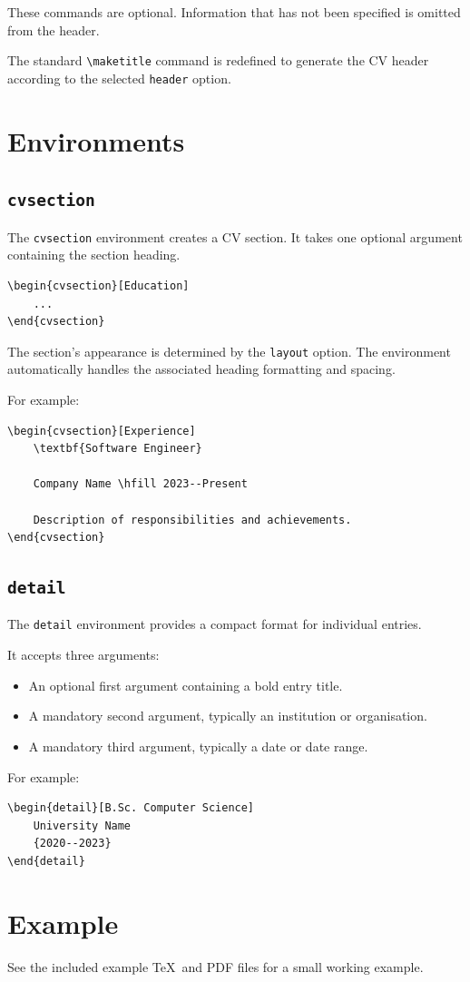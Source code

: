 \documentclass[10pt]{article}
\begin{document}
These commands are optional. Information that has not
been specified is omitted from the header.

The standard \verb|\maketitle| command is redefined to
generate the CV header according to the selected
\verb|header| option.

\section{Environments}

\subsection{\texttt{cvsection}}

The \texttt{cvsection} environment creates a CV section.
It takes one optional argument containing the section
heading.

\begin{verbatim}
\begin{cvsection}[Education]
    ...
\end{cvsection}
\end{verbatim}

The section's appearance is determined by the
\verb|layout| option. The environment automatically
handles the associated heading formatting and spacing.

For example:

\begin{verbatim}
\begin{cvsection}[Experience]
    \textbf{Software Engineer}

    Company Name \hfill 2023--Present

    Description of responsibilities and achievements.
\end{cvsection}
\end{verbatim}

\subsection{\texttt{detail}}

The \texttt{detail} environment provides a compact
format for individual entries.

It accepts three arguments:

\begin{itemize}
    \item An optional first argument containing a bold
    entry title.
    \item A mandatory second argument, typically an
    institution or organisation.
    \item A mandatory third argument, typically a date
    or date range.
\end{itemize}

For example:

\begin{verbatim}
\begin{detail}[B.Sc. Computer Science]
    University Name
    {2020--2023}
\end{detail}
\end{verbatim}

\section{Example}

See the included example \TeX\, and PDF files for a small working example.
\end{document}
